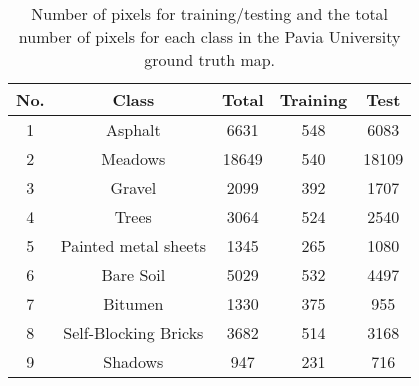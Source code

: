 \documentclass[12pt,onecolumn]{IEEEtran}
\begin{document}
\begin{spacing}{2}
\begin{table}\small
\centering
\caption{Number of pixels for training/testing and the total number of pixels for each class in the Pavia University ground truth map.}
\label{PUST}
\begin{tabular}{|c|c|c|c|c|}
\hline
No.  &  Class                     & Total         & Training  & Test       \\\hline
1    & Asphalt                    & 6631           &   548       &  6083   \\\hline
2    & Meadows                    & 18649          &   540     &  18109    \\\hline
3    & Gravel                     & 2099           &   392      &  1707    \\\hline
4    & Trees                      & 3064           &   524      &  2540    \\\hline
5    & Painted metal sheets       & 1345           &   265      &  1080    \\\hline
6    & Bare Soil                  & 5029           &   532      &  4497    \\\hline
7    &  Bitumen                   & 1330           &   375       &  955    \\\hline
8    & Self-Blocking Bricks       & 3682           &   514      &  3168    \\\hline
9    & Shadows                    & 947            &   231      &  716     \\\hline
\end{tabular}
\end{table}


\end{spacing}
\end{document}
